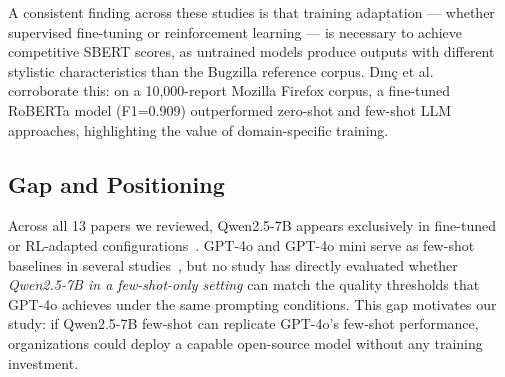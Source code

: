 A consistent finding across these studies is that training
adaptation --- whether supervised fine-tuning or reinforcement
learning --- is necessary to achieve competitive SBERT scores,
as untrained models produce outputs with different stylistic
characteristics than the Bugzilla reference corpus.
Dın\c{c} et al.~\cite{dinc2025quality} corroborate this:
on a 10,000-report Mozilla Firefox corpus, a fine-tuned
RoBERTa model (F1=0.909) outperformed zero-shot and
few-shot LLM approaches, highlighting the value of
domain-specific training.

\subsection{Gap and Positioning}

Across all 13 papers we reviewed, Qwen2.5-7B appears
exclusively in fine-tuned or RL-adapted
configurations~\cite{acharya2025bugquality,
choi2025agentreport, yang2025ctqrsrl}. GPT-4o and
GPT-4o mini serve as few-shot baselines in several
studies~\cite{acharya2025bugquality, akyol2026improbr},
but no study has directly evaluated whether
\emph{Qwen2.5-7B in a few-shot-only setting} can
match the quality thresholds that GPT-4o achieves
under the same prompting conditions. This gap motivates
our study: if Qwen2.5-7B few-shot can replicate
GPT-4o's few-shot performance, organizations could
deploy a capable open-source model without any training
investment.
